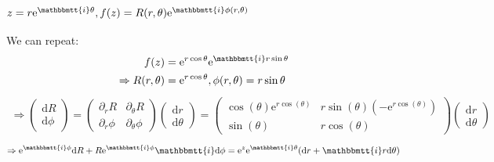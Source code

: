 \documentclass[]{ctexart}
\newcommand{\mi}{\mathbbmtt{i}}
\newcommand{\di}{\mathrm{d}}
\newcommand{\pa}{\partial}
\newcommand{\me}{\mathrm{e}}
\begin{document}
		\subsubsection{$z=r\me ^{\mi \theta},f(z)=R(r,\theta)\me ^{\mi \phi(r,\theta)}$}
			We can repeat:
				\begin{equation*}
				\begin{aligned}
					f(z)&=\me ^{r\cos\theta}\me ^{\mi r\sin\theta}\\
					\Rightarrow R(r,\theta)&=\me ^{r\cos\theta},\phi(r,\theta)=r\sin\theta
				\end{aligned}
				\end{equation*}
				\begin{equation*}
				\begin{aligned}
				\Rightarrow
				\begin{pmatrix}
					\di R\\
					\di \phi
				\end{pmatrix}
				=
				\begin{pmatrix}
					\pa_rR & \pa_{\theta}R\\
					\pa_r\phi & \pa_{\theta}\phi
				\end{pmatrix}
				\begin{pmatrix}
					\di r\\
					\di \theta
				\end{pmatrix}
				=
				\begin{pmatrix}
					\cos (\theta ) \me^{r \cos (\theta )} & r \sin (\theta ) \left(-\me^{r \cos (\theta )}\right)\\
					\sin (\theta ) & r\cos(\theta)
				\end{pmatrix}
				\begin{pmatrix}
					\di r\\
					\di \theta
				\end{pmatrix}
				\end{aligned}
				\end{equation*}
				\begin{equation*}
				\begin{aligned}
					\Rightarrow \me ^{\mi \phi }\di R+R\me ^{\mi \phi}\mi \di \phi=\me ^z\me ^{\mi \theta}(\di r+\mi r \di \theta)
				\end{aligned}
				\end{equation*}
				
\end{document}
